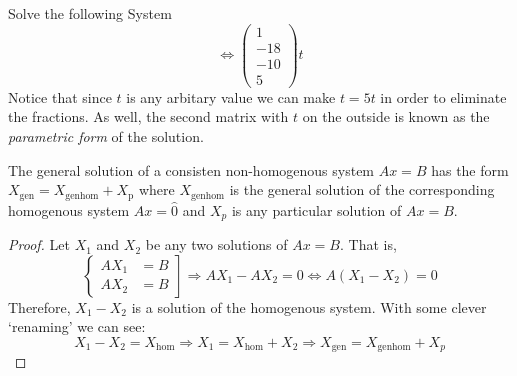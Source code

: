 \begin{example}{Solve the following System}{}
\[        \Leftrightarrow 
        \begin{pmatrix}
            1 \\ -18 \\ -10 \\ 5
        \end{pmatrix}t
    \]
    Notice that since $t$ is any arbitary value we can make $t = 5t$ in order to eliminate the fractions. As well, the second matrix with $t$ on the outside is known as the \textit{parametric form} of the solution.
\end{example}

\begin{thm}{}{}
    The general solution of a consisten non-homogenous system $Ax=B$ has the form $X_{\text{gen}} = X_{\text{genhom}} + X_{\text{p}}$ where $X_{\text{genhom}}$ is the general solution of the corresponding homogenous system $Ax=\hat{0}$ and $X_p$ is any particular solution of $Ax=B$.
    \begin{proof}
       Let $X_1$ and $X_2$ be any two solutions of $Ax=B$. That is, 
       \[\left.\begin{cases}
            AX_1 &= B \\
            AX_2 &= B
       \end{cases}\right]
       \Rightarrow AX_1 - AX_2 = 0 \Leftrightarrow A(X_1-X_2) = 0\] 
       Therefore, $X_1 - X_2$ is a solution of the homogenous system. With some clever `renaming' we can see:
       \[X_1 - X_2 = X_{\text{hom}} \Rightarrow X_1 = X_{\text{hom}} + X_2 \Rightarrow X_{\text{gen}} = X_{\text{genhom}} + X_{p}\]
    \end{proof}
\end{thm}

